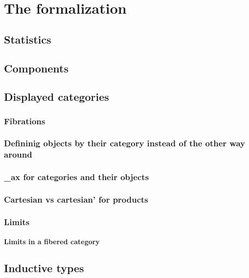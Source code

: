 \chapter{The formalization}

\section{Statistics}

\section{Components}

\section{Displayed categories}

\subsection{Fibrations}

\subsection{Defininig objects by their category instead of the other way around}

\subsection{\_ax for categories and their objects}

\subsection{Cartesian vs cartesian' for products}

\subsection{Limits}

\subsubsection{Limits in a fibered category}

\section{Inductive types}

